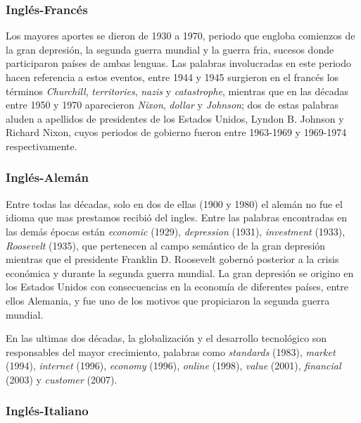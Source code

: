 \subsubsection*{Inglés-Francés}

Los mayores aportes se dieron de 1930 a 1970, periodo que engloba comienzos de la gran depresión, la segunda guerra mundial y la guerra fria, sucesos donde participaron países de ambas lenguas. Las palabras involucradas en este periodo hacen referencia a estos eventos, entre 1944 y 1945 surgieron en el francés los términos \textit{Churchill}, \textit{territories}, \textit{nazis} y \textit{catastrophe},  mientras que en las décadas entre 1950 y 1970 aparecieron \textit{Nixon}, \textit{dollar} y \textit{Johnson}; dos de estas palabras aluden a apellidos de presidentes de los Estados Unidos,  Lyndon B. Johnson y Richard Nixon, cuyos periodos de gobierno fueron  entre 1963-1969 y 1969-1974 respectivamente.



\subsubsection*{Inglés-Alemán} 


Entre todas las décadas, solo en dos de ellas (1900  y 1980) el alemán no fue el idioma que mas prestamos recibió  del ingles. Entre las palabras encontradas en las demás épocas están \textit{economic} (1929), \textit{depression} (1931),  \textit{investment} (1933), \textit{Roosevelt} (1935), que pertenecen al campo semántico de la gran depresión mientras que el presidente Franklin D. Roosevelt  gobernó posterior a la crisis económica y durante la segunda guerra mundial. La gran depresión se origino en los Estados Unidos con consecuencias en la economía de diferentes países, entre ellos  Alemania, y fue uno de los motivos que propiciaron la segunda guerra mundial.

En las ultimas dos décadas, la globalización y  el desarrollo tecnológico son responsables del mayor crecimiento, palabras como \textit{standards} (1983), \textit{market} (1994), \textit{internet} (1996), \textit{economy} (1996), \textit{online} (1998), \textit{value} (2001), \textit{financial} (2003) y \textit{customer} (2007). 


\subsubsection*{Inglés-Italiano}


